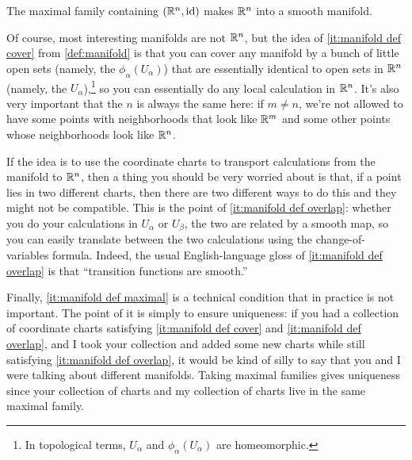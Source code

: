 \begin{example}
	The maximal family containing $(\mathbb{R}^n, \operatorname{id})$ makes $\mathbb{R}^n$ into a smooth manifold.
\end{example}

Of course, most interesting manifolds are not $\mathbb{R}^n$, but the idea of \ref{it:manifold def cover} from \cref{def:manifold} is that you can cover any manifold by a bunch of little open sets (namely, the $\phi_\alpha(U_\alpha)$) that are essentially identical to open sets in $\mathbb{R}^n$ (namely, the $U_\alpha$),\footnote{In topological terms, $U_\alpha$ and $\phi_\alpha(U_\alpha)$ are homeomorphic.} so you can essentially do any local calculation in $\mathbb{R}^n$. It's also very important that the $n$ is always the same here: if $m \neq n$, we're not allowed to have some points with neighborhoods that look like $\mathbb{R}^m$ and some other points whose neighborhoods look like $\mathbb{R}^n$.

If the idea is to use the coordinate charts to transport calculations from the manifold to $\mathbb{R}^n$, then a thing you should be very worried about is that, if a point lies in two different charts, then there are two different ways to do this and they might not be compatible. This is the point of \ref{it:manifold def overlap}: whether you do your calculations in $U_\alpha$ or $U_\beta$, the two are related by a smooth map, so you can easily translate between the two calculations using the change-of-variables formula. Indeed, the usual English-language gloss of \ref{it:manifold def overlap} is that ``transition functions are smooth.''

Finally, \ref{it:manifold def maximal} is a technical condition that in practice is not important. The point of it is simply to ensure uniqueness: if you had a collection of coordinate charts satisfying \ref{it:manifold def cover} and \ref{it:manifold def overlap}, and I took your collection and added some new charts while still satisfying \ref{it:manifold def overlap}, it would be kind of silly to say that you and I were talking about different manifolds. Taking maximal families gives uniqueness since your collection of charts and my collection of charts live in the same maximal family.


